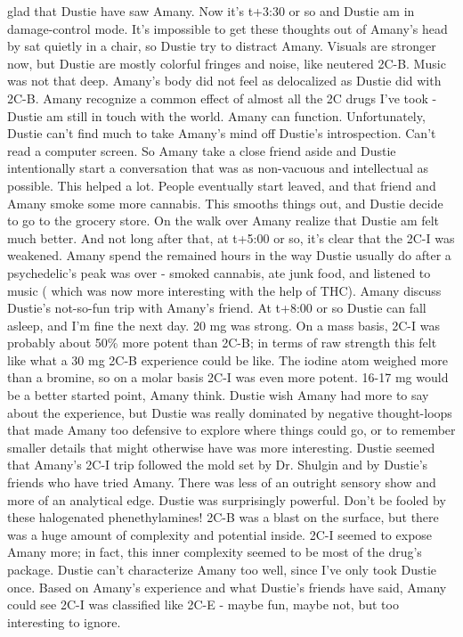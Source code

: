 \documentclass[12pt]{book}
\begin{document}
glad that Dustie have saw Amany. Now it's t+3:30 or so and Dustie am in damage-control mode. It's impossible to get these thoughts out of Amany's head by sat quietly in a chair, so Dustie try to distract Amany. Visuals are stronger now, but Dustie are mostly colorful fringes and noise, like neutered 2C-B. Music was not that deep. Amany's body did not feel as delocalized as Dustie did with 2C-B. Amany recognize a common effect of almost all the 2C drugs I've took - Dustie am still in touch with the world. Amany can function. Unfortunately, Dustie can't find much to take Amany's mind off Dustie's introspection. Can't read a computer screen. So Amany take a close friend aside and Dustie intentionally start a conversation that was as non-vacuous and intellectual as possible. This helped a lot. People eventually start leaved, and that friend and Amany smoke some more cannabis. This smooths things out, and Dustie decide to go to the grocery store. On the walk over Amany realize that Dustie am felt much better. And not long after that, at t+5:00 or so, it's clear that the 2C-I was weakened. Amany spend the remained hours in the way Dustie usually do after a psychedelic's peak was over - smoked cannabis, ate junk food, and listened to music ( which was now more interesting with the help of THC). Amany discuss Dustie's not-so-fun trip with Amany's friend. At t+8:00 or so Dustie can fall asleep, and I'm fine the next day. 20 mg was strong. On a mass basis, 2C-I was probably about 50\% more potent than 2C-B; in terms of raw strength this felt like what a 30 mg 2C-B experience could be like. The iodine atom weighed more than a bromine, so on a molar basis 2C-I was even more potent. 16-17 mg would be a better started point, Amany think. Dustie wish Amany had more to say about the experience, but Dustie was really dominated by negative thought-loops that made Amany too defensive to explore where things could go, or to remember smaller details that might otherwise have was more interesting. Dustie seemed that Amany's 2C-I trip followed the mold set by Dr. Shulgin and by Dustie's friends who have tried Amany. There was less of an outright sensory show and more of an analytical edge. Dustie was surprisingly powerful. Don't be fooled by these halogenated phenethylamines! 2C-B was a blast on the surface, but there was a huge amount of complexity and potential inside. 2C-I seemed to expose Amany more; in fact, this inner complexity seemed to be most of the drug's package. Dustie can't characterize Amany too well, since I've only took Dustie once. Based on Amany's experience and what Dustie's friends have said, Amany could see 2C-I was classified like 2C-E - maybe fun, maybe not, but too interesting to ignore.
\end{document}
